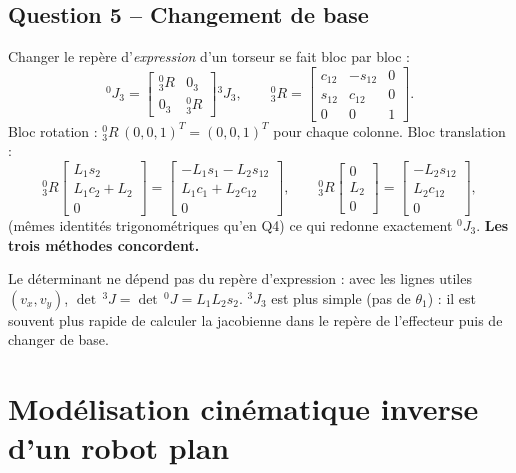 \documentclass[11pt,a4paper]{article}
\newcommand{\col}[3]{\begin{bmatrix}#1\\#2\\#3\end{bmatrix}}
\begin{document}
\subsection*{Question 5 -- Changement de base}
Changer le repère d'\emph{expression} d'un torseur se fait bloc par bloc :
\[{}^0J_3=\begin{bmatrix}{}^0_3R&0_3\\0_3&{}^0_3R\end{bmatrix}{}^3J_3,\qquad {}^0_3R=\begin{bmatrix}c_{12}&-s_{12}&0\\s_{12}&c_{12}&0\\0&0&1\end{bmatrix}.\]
Bloc rotation : ${}^0_3R\,(0,0,1)^T=(0,0,1)^T$ pour chaque colonne. Bloc translation :
\[{}^0_3R\col{L_1s_2}{L_1c_2+L_2}0=\col{-L_1s_1-L_2s_{12}}{L_1c_1+L_2c_{12}}0,\qquad {}^0_3R\col0{L_2}0=\col{-L_2s_{12}}{L_2c_{12}}0,\]
(mêmes identités trigonométriques qu'en Q4) ce qui redonne exactement ${}^0J_3$. \textbf{Les trois méthodes concordent.}

\begin{rem}[À retenir]
Le déterminant ne dépend pas du repère d'expression : avec les lignes utiles $(v_x,v_y)$, $\det\,{}^3J=\det\,{}^0J=L_1L_2s_2$. ${}^3J_3$ est plus simple (pas de $\theta_1$) : il est souvent plus rapide de calculer la jacobienne dans le repère de l'effecteur puis de changer de base.
\end{rem}

\section{Modélisation cinématique inverse d'un robot plan}
\end{document}

